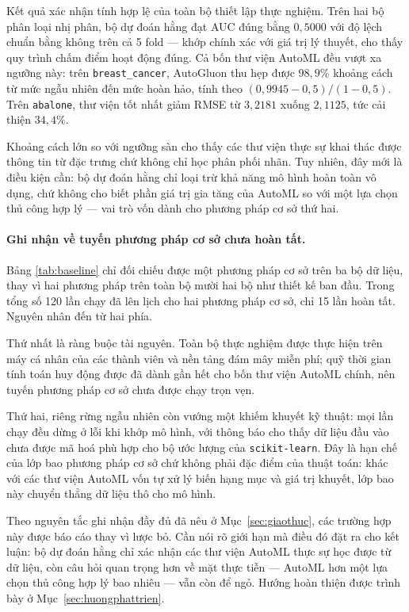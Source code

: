 Kết quả xác nhận tính hợp lệ của toàn bộ thiết lập thực nghiệm. Trên hai bộ phân
loại nhị phân, bộ dự đoán hằng đạt AUC đúng bằng $0{,}5000$ với độ lệch chuẩn bằng
không trên cả 5 fold --- khớp chính xác với giá trị lý thuyết, cho thấy quy trình
chấm điểm hoạt động đúng. Cả bốn thư viện AutoML đều vượt xa ngưỡng này: trên
\texttt{breast\_cancer}, AutoGluon thu hẹp được $98{,}9\%$ khoảng cách từ mức ngẫu
nhiên đến mức hoàn hảo, tính theo $(0{,}9945 - 0{,}5)/(1 - 0{,}5)$. Trên
\texttt{abalone}, thư viện tốt nhất giảm RMSE từ $3{,}2181$ xuống $2{,}1125$, tức
cải thiện $34{,}4\%$.

Khoảng cách lớn so với ngưỡng sàn cho thấy các thư viện thực sự khai thác được
thông tin từ đặc trưng chứ không chỉ học phân phối nhãn. Tuy nhiên, đây mới là
điều kiện cần: bộ dự đoán hằng chỉ loại trừ khả năng mô hình hoàn toàn vô dụng,
chứ không cho biết phần giá trị gia tăng của AutoML so với một lựa chọn thủ công
hợp lý --- vai trò vốn dành cho phương pháp cơ sở thứ hai.

\paragraph{Ghi nhận về tuyến phương pháp cơ sở chưa hoàn tất.} Bảng
\ref{tab:baseline} chỉ đối chiếu được một phương pháp cơ sở trên ba bộ dữ liệu,
thay vì hai phương pháp trên toàn bộ mười hai bộ như thiết kế ban đầu. Trong tổng
số 120 lần chạy đã lên lịch cho hai phương pháp cơ sở, chỉ 15 lần hoàn tất. Nguyên
nhân đến từ hai phía.

Thứ nhất là ràng buộc tài nguyên. Toàn bộ thực nghiệm được thực hiện trên máy cá
nhân của các thành viên và nền tảng đám mây miễn phí; quỹ thời gian tính toán huy
động được đã dành gần hết cho bốn thư viện AutoML chính, nên tuyến phương pháp cơ
sở chưa được chạy trọn vẹn.

Thứ hai, riêng rừng ngẫu nhiên còn vướng một khiếm khuyết kỹ thuật: mọi lần chạy
đều dừng ở lỗi khi khớp mô hình, với thông báo cho thấy dữ liệu đầu vào chưa được
mã hoá phù hợp cho bộ ước lượng của \texttt{scikit-learn}. Đây là hạn chế của lớp
bao phương pháp cơ sở chứ không phải đặc điểm của thuật toán: khác với các thư
viện AutoML vốn tự xử lý biến hạng mục và giá trị khuyết, lớp bao này chuyển thẳng
dữ liệu thô cho mô hình.

Theo nguyên tắc ghi nhận đầy đủ đã nêu ở Mục~\ref{sec:giaothuc}, các trường hợp
này được báo cáo thay vì lược bỏ. Cần nói rõ giới hạn mà điều đó đặt ra cho kết
luận: bộ dự đoán hằng chỉ xác nhận các thư viện AutoML thực sự học được từ dữ
liệu, còn câu hỏi quan trọng hơn về mặt thực tiễn --- AutoML hơn một lựa chọn thủ
công hợp lý bao nhiêu --- vẫn còn để ngỏ. Hướng hoàn thiện được trình bày ở
Mục~\ref{sec:huongphattrien}.

